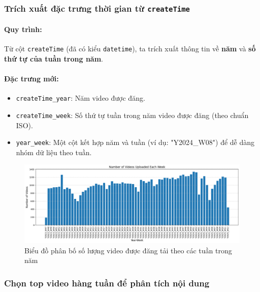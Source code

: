 \subsubsection{Trích xuất đặc trưng thời gian từ \texttt{createTime}}

\paragraph{Quy trình:}
Từ cột \texttt{createTime} (đã có kiểu \texttt{datetime}), ta trích xuất thông tin về \textbf{năm} và \textbf{số thứ tự của tuần trong năm}.

\paragraph{Đặc trưng mới:}
\begin{itemize}
    \item \texttt{createTime\_year}: Năm video được đăng.
    
    \item \texttt{createTime\_week}: Số thứ tự tuần trong năm video được đăng (theo chuẩn ISO).
    
    \item \texttt{year\_week}: Một cột kết hợp năm và tuần (ví dụ: "Y2024\_W08") để dễ dàng nhóm dữ liệu theo tuần.
\end{itemize}

\begin{figure}[H]
    \centering
    \includegraphics[width=1\linewidth]{img/21127739/num_video_per_week.png}
    \caption{Biểu đồ phân bố số lượng video được đăng tải theo các tuần trong năm}
    \label{fig:num_video_per_week}
\end{figure}

\subsubsection{Chọn top video hàng tuần để phân tích nội dung} \label{subsubsec:top_20_percent_video}

